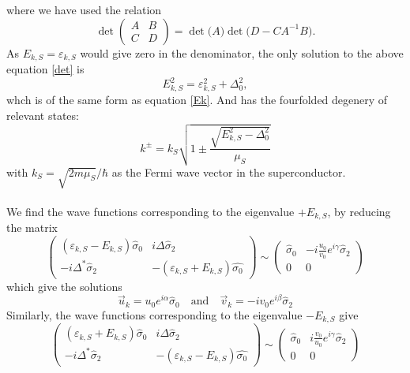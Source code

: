 where we have used the relation 
\begin{equation}
\det\begin{pmatrix}
A & B \\ C & D
\end{pmatrix}
= \det\big(A\big)\det\big(D-CA^{-1}B\big).
\end{equation}
As $E_{k,S} = \varepsilon_{k,S}$ would give zero in the denominator, the only solution to the above equation \eqref{det} is
\begin{equation}
E_{k,S}^2 = \varepsilon_{k,S}^2 + \Delta_0^2,
\end{equation}
whch is of the same form as equation \eqref{Ek}. And has the fourfolded degenery of relevant states:
\begin{equation}
k^{\pm} = k_S \sqrt{1 \pm \frac{\sqrt{E_{k,S}^2 - \Delta_0^2}}{\mu_S}}
\end{equation}
with $k_S = \sqrt{2m\mu_S}/\hbar$ as the Fermi wave vector in the superconductor. 
\\
\\
We find the wave functions corresponding to the eigenvalue $+E_{k,S}$, by reducing the matrix
\begin{equation}
\begin{pmatrix}
(\varepsilon_{k,S} - E_{k,S}) \hat{\sigma}_0 & i\Delta\hat{\sigma}_2 \\
-i\Delta^*\hat{\sigma}_2 & -(\varepsilon_{k,S} + E_{k,S})\hat{\sigma_0}  
\end{pmatrix}
\sim
\begin{pmatrix}
\hat{\sigma}_0 & -i\frac{u_0}{v_0}e^{i\gamma}\hat{\sigma}_2 \\
0 & 0
\end{pmatrix}
\end{equation}
which give the solutions
\begin{equation}
    \vec{u}_k = u_0e^{i\alpha}\hat{\sigma}_0
    \quad \mathrm{and} \quad
    \vec{v}_k = -iv_0e^{i\beta}\hat{\sigma}_2
\end{equation}
Similarly, the wave functions corresponding to the eigenvalue $-E_{k,S}$ give
\begin{equation}
\begin{pmatrix}
(\varepsilon_{k,S} + E_{k,S}) \hat{\sigma}_0 & i\Delta\hat{\sigma}_2 \\
-i\Delta^*\hat{\sigma}_2 & -(\varepsilon_{k,S} - E_{k,S})\hat{\sigma_0}  
\end{pmatrix}
\sim
\begin{pmatrix}
\hat{\sigma}_0 & i\frac{v_0}{u_0}e^{i\gamma}\hat{\sigma}_2 \\
0 & 0
\end{pmatrix}
\end{equation}
